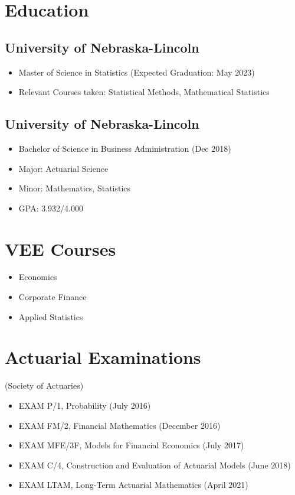 \documentclass{cv_style}
\begin{document}

    \begin{center} 


	\end{center}

	\section{Education}
	  \subsection{University of Nebraska-Lincoln}
	      \begin{itemize}
				  \item Master of Science in Statistics (Expected Graduation: May 2023)
				  \item Relevant Courses taken: Statistical Methods, Mathematical Statistics
				\end{itemize}
		\subsection{University of Nebraska-Lincoln}
				\begin{itemize}
				  \item Bachelor of Science in Business Administration (Dec 2018)
				  \item Major: Actuarial Science
				  \item Minor: Mathematics, Statistics
				  \item GPA: 3.932/4.000
			  \end{itemize}

	\section{VEE Courses}
		\begin{itemize}
			\item Economics
			\item Corporate Finance
			\item Applied Statistics
		\end{itemize}

	\section{Actuarial Examinations} (Society of Actuaries)
		\begin{itemize}
			\item EXAM P/1, Probability (July 2016)
			\item EXAM FM/2, Financial Mathematics (December 2016)
			\item EXAM MFE/3F, Models for Financial Economics (July 2017)
			\item EXAM C/4, Construction and Evaluation of Actuarial Models (June 2018)
			\item EXAM LTAM, Long-Term Actuarial Mathematics (April 2021)
		\end{itemize}
\end{document}
